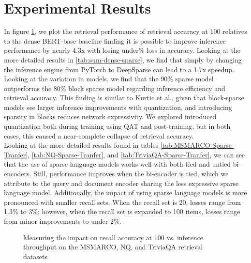\documentclass[11pt]{article}
\begin{document}
\section{Experimental Results}
In figure \ref{fig:sparse}, we plot the retrieval performance of retrieval accuracy at 100 relatives to the dense BERT-base baseline finding it is possible to improve inference performance by nearly 4.3x with losing under\% loss in accuracy. Looking at the more detailed results in \ref{tab:sum-dense-sparse}, we find that simply by changing the inference engine from PyTorch to DeepSparse can lead to a 1.7x speedup. Looking at the variation in models, we find that the 90\% sparse model outperforms the 80\% block sparse model regarding inference efficiency and retrieval accuracy. This finding is similar to Kurtic et al., given that block-sparse models see larger inference improvements with quantization, and introducing sparsity in blocks reduces network expressivity. We explored introduced quantization both during training using QAT and post-training, but in both cases, this caused a near-complete collapse of retrieval accuracy.  \\
Looking at the more detailed results found in tables \ref{tab:MSMARCO-Sparse-Tranfer}, \ref{tab:NQ-Sparse-Tranfer}, and \ref{tab:TriviaQA-Sparse-Tranfer}, we can see that the use of sparse language models works well with both tied and untied bi-encoders. Still, performance improves when the bi-encoder is tied, which we attribute to the query and document encoder sharing the less expressive sparse language model. Additionally, the impact of using sparse language models is more pronounced with smaller recall sets. When the recall set is 20, losses range from 1.3\% to 3\%; however, when the recall set is expanded to 100 items, losses range from minor improvements to under 2\%.  
\begin{figure}[!htb]
    \centering
    \caption{Measuring the impact on recall accuracy at 100 vs. inference throughput on the MSMARCO, NQ, and TriviaQA retrieval datasets \label{fig:sparse}}
\end{figure}
\end{document}
